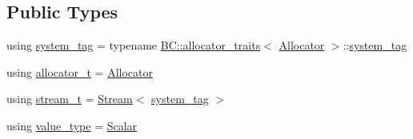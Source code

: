 \subsection*{Public Types}
\begin{DoxyCompactItemize}
\item 
using \hyperlink{classBC_1_1tensors_1_1exprs_1_1Array_a96a1013a82e525d29077f0a64c34dcce}{system\+\_\+tag} = typename \hyperlink{namespaceBC_a702bcffa3526460ac93fb2a315f2f7c7}{B\+C\+::allocator\+\_\+traits}$<$ \hyperlink{namespaceBC_a934f94b17b06290e6b241e5f59930c5f}{Allocator} $>$\+::\hyperlink{structBC_1_1allocators_1_1Host_a970d265edb8b984dd4c27535ab262cb0}{system\+\_\+tag}
\item 
using \hyperlink{classBC_1_1tensors_1_1exprs_1_1Array_a030984df764670f7624708e41b1f0107}{allocator\+\_\+t} = \hyperlink{namespaceBC_a934f94b17b06290e6b241e5f59930c5f}{Allocator}
\item 
using \hyperlink{classBC_1_1tensors_1_1exprs_1_1Array_a1c41223fe60cc224c729fd9bed2a5714}{stream\+\_\+t} = \hyperlink{namespaceBC_abc64a63cd29a22d102a68f478dfd588d}{Stream}$<$ \hyperlink{structBC_1_1allocators_1_1Host_a970d265edb8b984dd4c27535ab262cb0}{system\+\_\+tag} $>$
\item 
using \hyperlink{classBC_1_1tensors_1_1exprs_1_1Array_a8af0bfb94c7382d4a22de26e9d93d7f8}{value\+\_\+type} = \hyperlink{namespaceBC_1_1tensors_1_1common__using_a22de9a173f6aa6b07a3b4f543c9ad5c1}{Scalar}
\end{DoxyCompactItemize}
